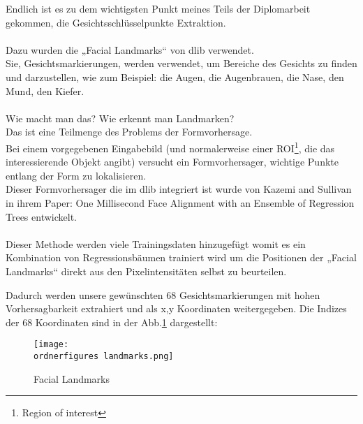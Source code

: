 Endlich ist es zu dem wichtigsten Punkt meines Teils der Diplomarbeit gekommen, die Gesichtsschlüsselpunkte Extraktion. \\\\
Dazu wurden die „Facial Landmarks“ von dlib verwendet. \\
Sie, Gesichtsmarkierungen, werden verwendet, um Bereiche des Gesichts zu finden und darzustellen, wie zum Beispiel: die Augen, die Augenbrauen, die Nase, den Mund, den Kiefer. \\\\
Wie macht man das? Wie erkennt man Landmarken? \\Das ist eine Teilmenge des Problems der Formvorhersage.\\ Bei einem vorgegebenen Eingabebild (und normalerweise einer ROI\footnote{Region of interest}, die das interessierende Objekt angibt) versucht ein Formvorhersager, wichtige Punkte entlang der Form zu lokalisieren. \\
Dieser Formvorhersager die im dlib integriert ist wurde von Kazemi and Sullivan in ihrem Paper: One Millisecond Face Alignment with an Ensemble of Regression Trees entwickelt. \\\\
Dieser Methode werden viele Trainingsdaten hinzugefügt womit es ein Kombination von Regressionsbäumen trainiert wird um die Positionen der „Facial Landmarks“ direkt aus den Pixelintensitäten selbst zu beurteilen. \\
\cite{Kazemi2014OneMF}

Dadurch werden unsere gewünschten 68 Gesichtsmarkierungen mit hohen Vorhersagbarkeit extrahiert und als x,y Koordinaten weitergegeben. 
Die Indizes der 68 Koordinaten sind in der Abb.\ref{fig:landmarks} dargestellt:\\




\begin{figure}[H]
	\texttt{[image: \\ordnerfigures landmarks.png]}
	\caption{Facial Landmarks}
	\label{fig:landmarks}
\end{figure}\cite{Kazemi2014OneMF}

